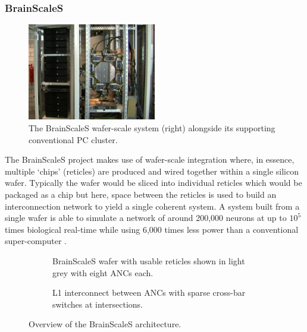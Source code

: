 			\subsubsection{BrainScaleS}
				
				\begin{figure}
					\center
					\includegraphics[width=0.5\textwidth]{figures/brainscales}
					
					\caption[The BrainScaleS wafer-scale system.]{The BrainScaleS
					wafer-scale system (right) alongside its supporting conventional PC cluster.}
					
					\label{fig:brainscales}
				\end{figure}
				
				The BrainScaleS project makes use of wafer-scale integration where, in
				essence, multiple `chips' (reticles) are produced and wired together
				within a single silicon wafer. Typically the wafer would be sliced into
				individual reticles which would be packaged as a chip but here, space
				between the reticles is used to build an interconnection network to
				yield a single coherent system. A system built from a single wafer is
				able to simulate a network of around 200,000 neurons at up to $10^5$
				times biological real-time while using 6,000 times less power than a
				conventional super-computer \cite{schemmel08}.
				
				\begin{figure}
					\center
					\begin{subfigure}[b]{0.45\textwidth}
						\center
						
						\caption{BrainScaleS wafer with usable reticles shown in light
						grey with eight ANCs each.}
						\label{fig:brainscales-wafer}
					\end{subfigure}
					\hspace{1ex}
					\begin{subfigure}[b]{0.45\textwidth}
						\center
						
						\caption{L1 interconnect between ANCs with sparse cross-bar
						switches at intersections.}
						\label{fig:brainscales-l1}
					\end{subfigure}
					
					\caption{Overview of the BrainScaleS architecture.}
					\label{fig:brainscales-topology}
				\end{figure}
				
